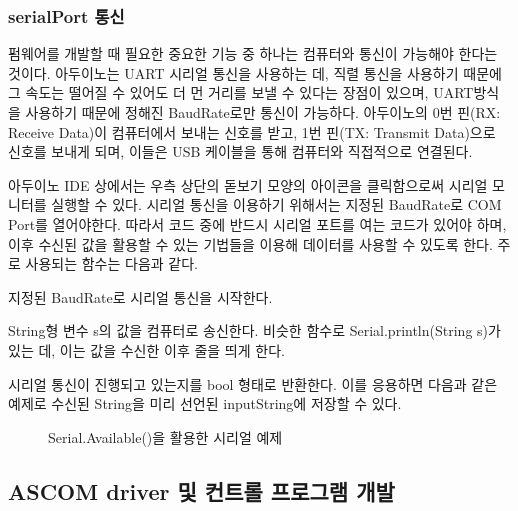 \subsubsection{serialPort 통신}
펌웨어를 개발할 때 필요한 중요한 기능 중 하나는 컴퓨터와 통신이 가능해야 한다는 것이다. 아두이노는 UART 시리얼 통신을 사용하는 데, 직렬 통신을 사용하기 때문에 그 속도는 떨어질 수 있어도 더 먼 거리를 보낼 수 있다는 장점이 있으며, UART방식을 사용하기 때문에 정해진 BaudRate로만 통신이 가능하다. 아두이노의 0번 핀(RX: Receive Data)이 컴퓨터에서 보내는 신호를 받고, 1번 핀(TX: Transmit Data)으로 신호를 보내게 되며, 이들은 USB 케이블을 통해 컴퓨터와 직접적으로 연결된다.

아두이노 IDE 상에서는 우측 상단의 돋보기 모양의 아이콘을 클릭함으로써 시리얼 모니터를 실행할 수 있다. 시리얼 통신을 이용하기 위해서는 지정된 BaudRate로 COM Port를 열어야한다. 따라서 코드 중에 반드시 시리얼 포트를 여는 코드가 있어야 하며, 이후 수신된 값을 활용할 수 있는 기법들을 이용해 데이터를 사용할 수 있도록 한다. 주로 사용되는 함수는 다음과 같다.

\begin{description}[font=$\bullet$~\normalfont\scshape\color{red!50!black}]
	\item [Serial.begin(int BaudRate)] 지정된 BaudRate로 시리얼 통신을 시작한다.
	\item [Serial.print(String s)] String형 변수 s의 값을 컴퓨터로 송신한다. 비슷한 함수로 Serial.println(String s)가 있는 데, 이는 값을 수신한 이후 줄을 띄게 한다.
	\item [Serial.available()] 시리얼 통신이 진행되고 있는지를 bool 형태로 반환한다. 이를 응용하면 다음과 같은 예제로 수신된 String을 미리 선언된 inputString에 저장할 수 있다.

\begin{figure}[h]
	\begin{center}
		\caption{Serial.Available()을 활용한 시리얼 예제}
		\label{fig:serialEvent}
	\end{center}
\end{figure}
\end{description}

\subsection{ASCOM driver 및 컨트롤 프로그램 개발}

